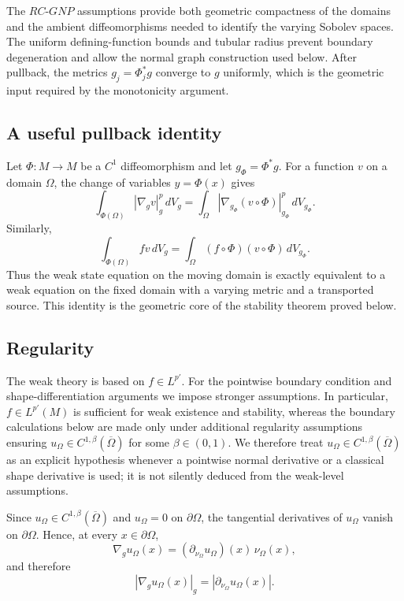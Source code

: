 \documentclass{article}
\begin{document}
The $RC$-$GNP$ assumptions provide both geometric compactness of the domains and the ambient diffeomorphisms needed to identify the varying Sobolev spaces. The uniform defining-function bounds and tubular radius prevent boundary degeneration and allow the normal graph construction used below. After pullback, the metrics $g_j=\Phi_j^*g$ converge to $g$ uniformly, which is the geometric input required by the monotonicity argument.

\subsection{A useful pullback identity}

Let $\Phi:M\to M$ be a $C^1$ diffeomorphism and let $g_\Phi=\Phi^*g$.
For a function $v$ on a domain $\Omega$, the change of variables
$y=\Phi(x)$ gives
\[
\int_{\Phi(\Omega)}|\nabla_gv|_g^p\,dV_g
=
\int_\Omega|\nabla_{g_\Phi}(v\circ\Phi)|_{g_\Phi}^p\,dV_{g_\Phi}.
\]
Similarly,
\[
\int_{\Phi(\Omega)}fv\,dV_g
=
\int_\Omega(f\circ\Phi)(v\circ\Phi)\,dV_{g_\Phi}.
\]
Thus the weak state equation on the moving domain is exactly equivalent
to a weak equation on the fixed domain with a varying metric and a
transported source. This identity is the geometric core of the
stability theorem proved below.


\subsection{Regularity}

The weak theory is based on $f\in L^{p'}$. For the pointwise boundary
condition and shape-differentiation arguments we impose stronger
assumptions. In particular, $f\in L^{p'}(M)$ is sufficient for weak
existence and stability, whereas the boundary calculations below are
made only under additional regularity assumptions ensuring
$u_\Omega\in C^{1,\beta}(\overline{\Omega})$ for some $\beta\in(0,1)$.
We therefore treat $u_\Omega\in C^{1,\beta}(\overline{\Omega})$ as an
explicit hypothesis whenever a pointwise normal derivative or a classical
shape derivative is used; it is not silently deduced from the weak-level
assumptions.

Since $u_\Omega\in C^{1,\beta}(\overline{\Omega})$ and
$u_\Omega=0$ on $\partial\Omega$, the tangential derivatives of
$u_\Omega$ vanish on $\partial\Omega$. Hence, at every
$x\in\partial\Omega$,
\[
\nabla_g u_\Omega(x)
=
(\partial_{\nu_\Omega}u_\Omega)(x)\,\nu_\Omega(x),
\]
and therefore
\[
|\nabla_g u_\Omega(x)|_g
=
|\partial_{\nu_\Omega}u_\Omega(x)|.
\]
\end{document}
